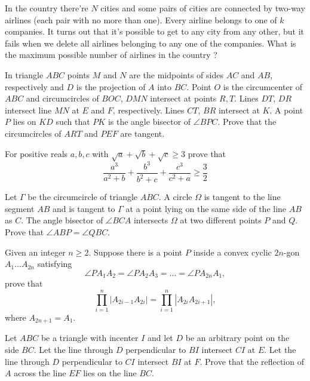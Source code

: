 \documentclass[11pt]{scrartcl}
\begin{document}
\begin{problem}[697045850918084]
	In the country there're $N$ cities and some pairs of cities are connected by two-way airlines (each pair with no more than one). Every airline belongs to one of $k$ companies. It turns out that it's possible to get to any city from any other, but it fails when we delete all airlines belonging to any one of the companies. What is the maximum possible number of airlines in the country ?
\end{problem}
\begin{problem}[697545974967766]
	In triangle $ABC$ points $M$ and $N$ are the midpoints of sides $AC$ and $AB$, respectively and $D$ is the projection of $A$ into $BC$. Point $O$ is the circumcenter of $ABC$ and circumcircles of $BOC$, $DMN$ intersect at points $R, T$. Lines $DT$, $DR$ intersect line $MN$ at $E$ and $F$, respectively. Lines $CT$, $BR$ intersect at $K$. A point $P$ lies on $KD$ such that $PK$ is the angle bisector of $\angle BPC$. Prove that the circumcircles of $ART$ and $PEF$ are tangent.
\end{problem}
\begin{problem}[697661822421145]
For positive reals $a,b,c$ with $\sqrt{a}+\sqrt{b}+\sqrt{c}\ge 3$ prove that
$$\frac{a^3}{a^2+b}+\frac{b^3}{b^2+c}+\frac{c^3}{c^2+a}\ge \frac{3}{2}$$
\end{problem}
\begin{problem}[699399831701585]
Let $\Gamma $ be the circumcircle of triangle $ABC$. A circle $\Omega$ is tangent to the line segment $AB$ and is tangent to $\Gamma$ at a point lying on the same side of the line $AB$ as $C$. The angle bisector of $\angle BCA$ intersects $\Omega$ at two different points $P$ and $Q$.
Prove that $\angle ABP = \angle QBC$.
\end{problem}
\begin{problem}[702587891849077]
	Given an integer $n \geqslant 2$. Suppose there is a point $P$ inside a convex cyclic $2n$-gon $A_1 \ldots A_{2n}$ satisfying$$\angle PA_1A_2 = \angle PA_2A_3 = \ldots = \angle PA_{2n}A_1,$$prove that$$ \prod_{i=1}^{n} \left|A_{2i - 1}A_{2i} \right| = \prod_{i=1}^{n} \left|A_{2i}A_{2i+1} \right|,$$where $A_{2n + 1} = A_1$.
\end{problem}
\begin{problem}[704326412238502]
	Let $ABC$ be a triangle with incenter $I$ and let $D$ be an arbitrary point on the side $BC$. Let the line through $D$ perpendicular to $BI$ intersect $CI$ at $E$. Let the line through $D$ perpendicular to $CI$ intersect $BI$ at $F$. Prove that the reflection of $A$ across the line $EF$ lies on the line $BC$.
\end{problem}
\end{document}
